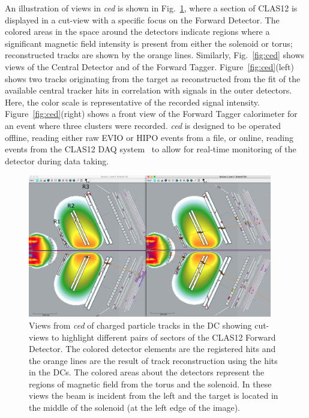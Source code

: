 An illustration of views in {\it ced} is shown in Fig.~\ref{fig:dcTracks}, where a section of CLAS12 is displayed in
a cut-view with a specific focus on the Forward Detector. The colored areas in the space around the detectors
indicate regions where a significant magnetic field intensity is present from either the solenoid or torus;
reconstructed tracks are shown by the orange lines. Similarly, Fig.~\ref{fig:ced} shows views of the Central
Detector and of the Forward Tagger. Figure~\ref{fig:ced}(left) shows two tracks originating from the target as
reconstructed from the fit of the available central tracker hits in correlation with signals in the outer detectors.
Here, the color scale is representative of the recorded signal intensity. Figure~\ref{fig:ced}(right) shows a
front view of the Forward Tagger calorimeter for an event where three clusters were recorded. {\it ced} is
designed to be operated offline, reading either raw EVIO or HIPO events from a file, or online, reading events
from the CLAS12 DAQ system~\cite{daq-nim} to allow for real-time monitoring of the detector during data taking.

\begin{figure}
\centering
\includegraphics[width=0.95\textwidth]{pics/dcTrack3.png}
\caption{Views from {\it ced} of charged particle tracks in the DC showing cut-views to highlight different pairs
  of sectors of the CLAS12 Forward Detector. The colored detector elements are the registered hits and the
  orange lines are the result of track reconstruction using the hits in the DCs. The colored areas about the
  detectors represent the regions of magnetic field from the torus and the solenoid. In these views the beam is
  incident from the left and the target is located in the middle of the solenoid (at the left edge of the image).}
\label{fig:dcTracks}
\end{figure}

